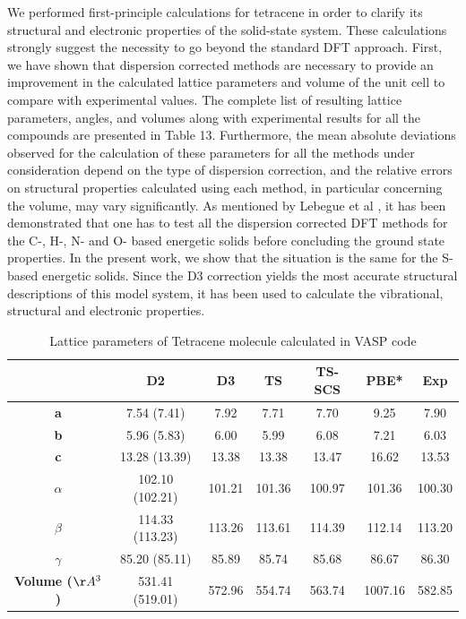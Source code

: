  We performed first-principle calculations for tetracene in order to clarify its structural and electronic properties of the solid-state system. These calculations strongly suggest the necessity to go beyond the standard DFT approach. First, we have shown that dispersion corrected methods are necessary to provide an improvement in the calculated lattice parameters and volume of the unit cell to compare with experimental values. The complete list of resulting lattice parameters, angles, and volumes along with experimental results for all the compounds are presented in Table 13. Furthermore, the mean absolute deviations observed for the calculation of these parameters for all the methods under consideration depend on the type of dispersion correction, and the relative errors on structural properties calculated using each method, in particular concerning the volume, may vary significantly. As mentioned by Lebegue et al \cite{appalakondaiah2015dispersion}, it has been demonstrated that one has to test all the dispersion corrected DFT methods for the C-, H-, N- and O- based energetic solids before concluding the ground state properties. In the present work, we show that the situation is the same for the S-based energetic solids. Since the D3 correction yields the most accurate structural descriptions of this model system, it has been used to calculate the vibrational, structural and electronic properties.
 
 \begin{table}[htb]
 	\caption{Lattice parameters of Tetracene molecule calculated in VASP code}
 	\begin{center}
 		\begin{tabular}{c c c c c c c}
 			\toprule
 			 & \textbf{D2} & \textbf{D3} & \textbf{TS} & \textbf{TS-SCS} & \textbf{PBE*} & \textbf{Exp} \\
 			 \midrule
 			 \textbf{a} &7.54 (7.41) &  7.92 & 7.71 & 7.70 & 9.25 & 7.90\\
 			 \textbf{b}& 5.96 (5.83) & 6.00 & 5.99 & 6.08 & 7.21 & 6.03 \\
 			 \textbf{c}& 13.28 (13.39) & 13.38 & 13.38 & 13.47 & 16.62 & 13.53 \\
 			 \textbf{$\alpha$} & 102.10 (102.21) & 101.21 & 101.36 & 100.97 & 101.36 &100.30\\
 			 \textbf{$\beta$} & 114.33 (113.23) & 113.26 & 113.61 & 114.39 & 112.14 & 113.20\\
 			 \textbf{$\gamma$} &85.20 (85.11) & 85.89 & 85.74 & 85.68 & 86.67 & 86.30\\
 			 \textbf{Volume ($\AA^{3}$)} & 531.41 (519.01) & 572.96 & 554.74 &  563.74 & 1007.16 & 582.85\\
 			 \bottomrule
 		\end{tabular}
 	\end{center}
 \end{table}
 

